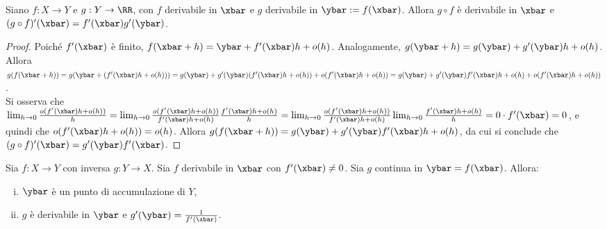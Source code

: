\documentclass[11pt]{article}
\begin{document}
	\begin{proposition}
		Siano $f : X \to Y$ e $g : Y \to \RR$, con $f$ derivabile in $\xbar$ e $g$ derivabile in $\ybar := f(\xbar)$. Allora $g \circ f$ è
		derivabile in $\xbar$ e $(g \circ f)'(\xbar) = f'(\xbar) g'(\ybar)$.
	\end{proposition}

	\begin{proof}
		Poiché $f'(\xbar)$ è finito, $f(\xbar + h) = \ybar + f'(\xbar) h + o(h)$. Analogamente, $g(\ybar + h) = g(\ybar) + g'(\ybar) h + o(h)$.
		Allora $g(f(\xbar + h)) = g(\ybar + (f'(\xbar) h + o(h))) =
		g(\ybar) + g'(\ybar) (f'(\xbar) h + o(h)) + o(f'(\xbar) h + o(h)) =
		g(\ybar) + g'(\ybar) f'(\xbar) h + o(h) + o(f'(\xbar) h + o(h))$. \\
		
		Si osserva che $\lim_{h \to 0} \frac{o(f'(\xbar) h + o(h))}{h} =
		\lim_{h \to 0} \frac{o(f'(\xbar) h + o(h))}{f'(\xbar) h + o(h)} \frac{f'(\xbar) h + o(h)}{h} = \lim_{h \to 0} \frac{o(f'(\xbar) h + o(h))}{f'(\xbar) h + o(h)} \lim_{h \to 0} \frac{f'(\xbar) h + o(h)}{h} =
		0 \cdot f'(\xbar) = 0$, e quindi che $o(f'(\xbar) h + o(h)) = o(h)$.
		Allora $g(f(\xbar + h)) = g(\ybar) + g'(\ybar) f'(\xbar) h + o(h)$,
		da cui si conclude che $(g \circ f)'(\xbar) = g'(\ybar) f'(\xbar)$.
	\end{proof}

	\begin{proposition}
		Sia $f : X \to Y$ con inversa $g : Y \to X$. Sia $f$ derivabile
		in $\xbar$ con $f'(\xbar) \neq 0$. Sia $g$ continua in $\ybar = f(\xbar)$. Allora:
		
		\begin{enumerate}[(i)]
			\item $\ybar$ è un punto di accumulazione di $Y$,
			\item $g$ è derivabile in $\ybar$ e $g'(\ybar) = \frac{1}{f'(\xbar)}$.
		\end{enumerate}
	\end{proposition}
\end{document}
